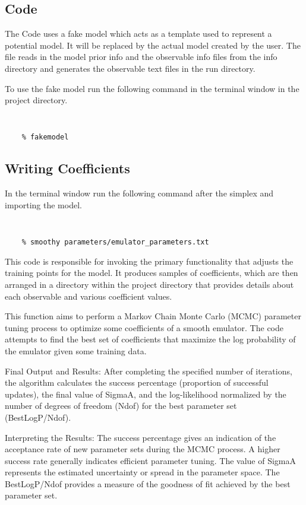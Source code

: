 \documentclass[main.tex]{subfiles}
\begin{document}
\begin{enumerate}
\subsection{Code}

The Code uses a fake model which acts as a template used to represent a potential model. It will be replaced by the actual model created by the user. The file reads in the model prior info and the observable info files from the info directory and generates the observable text files in the run directory. 

To use the fake model run the following command in the terminal window in the project directory. 

{\tt 
\begin{verbatim}
    % fakemodel 
\end{verbatim}
}
 
\subsection{Writing Coefficients}

In the terminal window run the following command after the simplex and importing the model.

{\tt 
\begin{verbatim}
    % smoothy parameters/emulator_parameters.txt 
\end{verbatim}
}

This code is responsible for invoking the primary functionality that adjusts the training points for the model. It produces samples of coefficients, which are then arranged in a directory within the project directory that provides details about each observable and various coefficient values.

This function aims to perform a Markov Chain Monte Carlo (MCMC) parameter tuning process to optimize some coefficients of a smooth emulator. The code attempts to find the best set of coefficients that maximize the log probability of the emulator given some training data. 

Final Output and Results:
After completing the specified number of iterations, the algorithm calculates the success percentage (proportion of successful updates), the final value of SigmaA, and the log-likelihood normalized by the number of degrees of freedom (Ndof) for the best parameter set (BestLogP/Ndof).  

Interpreting the Results:
The success percentage gives an indication of the acceptance rate of new parameter sets during the MCMC process. A higher success rate generally indicates efficient parameter tuning. The value of SigmaA represents the estimated uncertainty or spread in the parameter space. The BestLogP/Ndof provides a measure of the goodness of fit achieved by the best parameter set. 


\end{enumerate}
\end{document}

